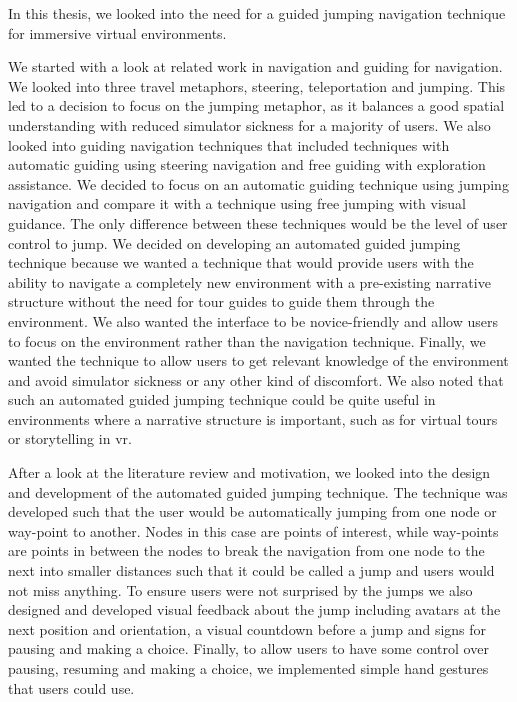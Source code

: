 \label{Chapter:Conclusion and Future Work}
In this thesis, we looked into the need for a guided jumping navigation technique for immersive virtual environments.

We started with a look at related work in navigation and guiding for navigation. We looked into three travel metaphors, steering, teleportation and jumping. This led to a decision to focus on the jumping metaphor, as it balances a good spatial understanding with reduced simulator sickness for a majority of users. We also looked into guiding navigation techniques that included techniques with automatic guiding using steering navigation and free guiding with exploration assistance. We decided to focus on an automatic guiding technique using jumping navigation and compare it with a technique using free jumping with visual guidance. The only difference between these techniques would be the level of user control to jump. We decided on developing an automated guided jumping technique because we wanted a technique that would provide users with the ability to navigate a completely new environment with a pre-existing narrative structure without the need for tour guides to guide them through the environment. We also wanted the interface to be novice-friendly and allow users to focus on the environment rather than the navigation technique. Finally, we wanted the technique to allow users to get relevant knowledge of the environment and avoid simulator sickness or any other kind of discomfort. We also noted that such an automated guided jumping technique could be quite useful in environments where a narrative structure is important, such as for virtual tours or storytelling in \acrshort{vr}.

After a look at the literature review and motivation, we looked into the design and development of the automated guided jumping technique. The technique was developed such that the user would be automatically jumping from one node or way-point to another. Nodes in this case are points of interest, while way-points are points in between the nodes to break the navigation from one node to the next into smaller distances such that it could be called a jump and users would not miss anything. To ensure users were not surprised by the jumps we also designed and developed visual feedback about the jump including avatars at the next position and orientation, a visual countdown before a jump and signs for pausing and making a choice. Finally, to allow users to have some control over pausing, resuming and making a choice, we implemented simple hand gestures that users could use.

